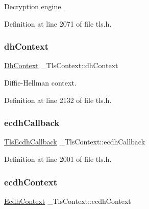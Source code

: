 Decryption engine. 



Definition at line 2071 of file tls.\+h.

\mbox{\label{struct__TlsContext_a4c8e13e84d672392dd262360c2d175c9}} 
\subsubsection{\texorpdfstring{dh\+Context}{dhContext}}
{\footnotesize\ttfamily \hyperlink{structDhContext}{Dh\+Context} \+\_\+\+Tls\+Context\+::dh\+Context}



Diffie-\/\+Hellman context. 



Definition at line 2132 of file tls.\+h.

\mbox{\label{struct__TlsContext_a039661027042c4f566138c8b1a5f280b}} 
\subsubsection{\texorpdfstring{ecdh\+Callback}{ecdhCallback}}
{\footnotesize\ttfamily \hyperlink{tls_8h_ad0cd644ab2e901c494d04e42bcc832d0}{Tls\+Ecdh\+Callback} \+\_\+\+Tls\+Context\+::ecdh\+Callback}



Definition at line 2001 of file tls.\+h.

\mbox{\label{struct__TlsContext_ace51fc0b1f1a9adbe357d7b8e880d8c8}} 
\subsubsection{\texorpdfstring{ecdh\+Context}{ecdhContext}}
{\footnotesize\ttfamily \hyperlink{structEcdhContext}{Ecdh\+Context} \+\_\+\+Tls\+Context\+::ecdh\+Context}



